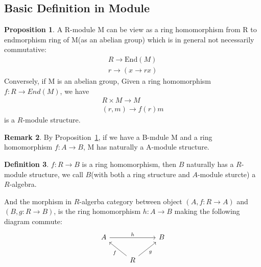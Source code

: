 \documentclass[a4paper,12pt]{article}
\theoremstyle{definition}
\newtheorem{defn}{Definition}[subsection]
\newtheorem{rema}[defn]{Remark}
\newtheorem{prop}[defn]{Proposition}
\begin{document}
\newpage
\subsection{Basic Definition in Module}
\begin{prop}
    A R-module M can be view as a ring homomorphism from R to endmorphism ring of M(as an abelian group) which is in general  not necessarily commutative:
    \begin{align*}
        R\rightarrow \text{End}(M) \\
        r\rightarrow  (x\rightarrow rx)
    \end{align*}
    Conversely, if M is an abelian group, Given a ring homomorphism $f:R \rightarrow End(M)$, we have
    \begin{align*}
        R\times M\rightarrow M \\
        (r,m)\rightarrow f(r)m
    \end{align*}
    is a $R$-module structure.
    \label{proposition:equivalent def of module}
\end{prop}
\begin{rema}
    By Proposition~\ref{proposition:equivalent def of module}, if we have a B-mdule M and a ring homomorphism $f:A\rightarrow B$, M has naturally a A-module structure.
\end{rema}
\begin{defn}
    $f:R\rightarrow B$ is a ring homomorphism, then $B$ naturally has a $R$-module structure, we call $B$(with both a ring structure and $A$-module sturcte) a $R$-algebra.

    And the morphism in $R$-algerba category between object $(A,f:R\rightarrow A)$ and $(B,g:R\rightarrow B)$, is the ring homomorphism $h:A\rightarrow B$ making the following diagram commute:
    \[\begin{tikzcd}
            A && B \\
            & R
            \arrow["h", from=1-1, to=1-3]
            \arrow["f", from=2-2, to=1-1]
            \arrow["g"', from=2-2, to=1-3]
        \end{tikzcd}\]
\end{defn}
\end{document}
